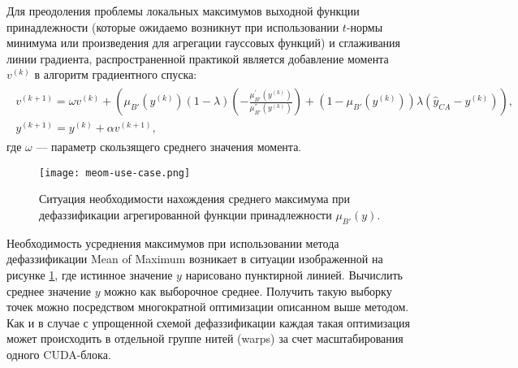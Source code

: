 Для преодоления проблемы локальных максимумов выходной функции принадлежности (которые ожидаемо возникнут при использовании $t$-нормы минимума или произведения для агрегации гауссовых функций) и сглаживания линии градиента, распространенной практикой является добавление момента $v^(k)$ в алгоритм градиентного спуска:
\begin{gather}
\begin{split}
	v^{(k+1)} = \omega v^{(k)} + (\mu_{B'}(y^{(k)})(1-\lambda)\left(-\frac{\mu_{B'}^{'}(y^{(k)})}{\mu_{B'}^{''}(y^{(k)})}\right) + (1-\mu_{B'}(y^{(k)}))\lambda (\hat{y}_{CA} - y^{(k)})),\\
	y^{(k+1)} = y^{(k)} + \alpha v^{(k+1)},
\end{split}
\label{eqn:defuz-impl-meom-3}
\end{gather}
где $\omega$ --- параметр скользящего среднего значения момента.

\begin{figure}[ht]
	\centering
	\texttt{[image: meom-use-case.png]}
	\caption{Ситуация необходимости нахождения среднего максимума при дефаззификации агрегированной функции принадлежности $\mu_{B'}(y)$.}
	\label{fig:defuz-meom-use-case}	
\end{figure}

Необходимость усреднения максимумов при использовании метода дефаззификации Mean of Maximum возникает в ситуации изображенной на рисунке \cref{fig:defuz-meom-use-case}, где истинное значение $y$ нарисовано пунктирной линией. Вычислить среднее значение $y$ можно как выборочное среднее. Получить такую выборку точек можно посредством многократной оптимизации описанном выше методом. Как и в случае с упрощенной схемой дефаззификации каждая такая оптимизация может происходить в отдельной группе нитей (warps) за счет масштабирования одного CUDA-блока.

